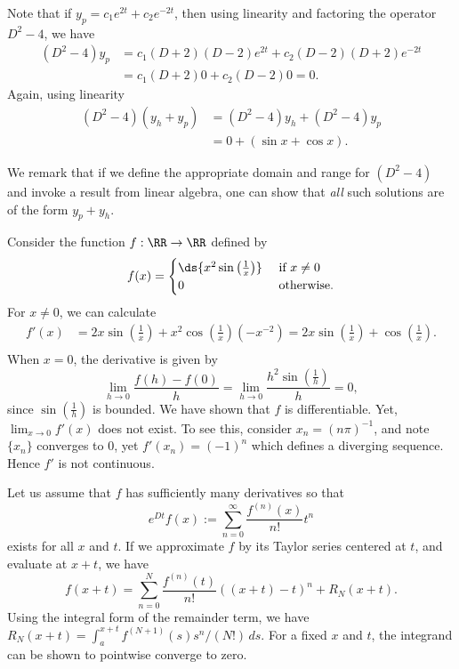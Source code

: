 \documentclass{homework}
\begin{document}

Note that if $y_p = c_1 e^{2t} + c_2 e^{-2t}$, then using linearity and factoring the operator $D^2 -4$, we have
\begin{align*}
  (D^2 - 4)y_p 
  &= c_1(D+2)(D - 2)e^{2t} + c_2(D-2)(D + 2)e^{-2t} \\
  &= c_1(D+2) 0 + c_2(D-2) 0 = 0.
\end{align*}
Again, using linearity
\begin{align*}
  (D^2 - 4) (y_h + y_p) 
  &= (D^2 -4)y_h + (D^2 -4)y_p\\
  &= 0 + (\sin x + \cos x).
\end{align*}

We remark that if we define the appropriate domain and range for $(D^2 - 4)$ and invoke a result from linear algebra, one can show that \emph{all} such solutions are of the form $y_p + y_h$.

\begin{solution}
  Consider the function $f:\RR \to \RR$ defined by
  $$
    f(x) = \begin{cases}
      \ds{x^2 \sin\left(\frac 1x\right)} & \text{ if } x \not= 0\\
      0 & \text{ otherwise.}
    \end{cases}
  $$
  For $x \not=0$, we can calculate
  \begin{align*}
    f'(x) 
    &= 2x \sin\left(\frac 1x\right) + x^2 \cos\left( \frac 1x\right) (-x^{-2})
    = 2x \sin\left(\frac 1x\right) + \cos\left( \frac 1x\right). \\
  \end{align*}
  When $x = 0$, the derivative is given by
  $$
    \lim_{h\to 0} \frac{ f(h) - f(0) }{h} = \lim_{h\to0} \frac{ h^2\sin\left(\frac 1h\right) }{h} = 0,
  $$
  since $\sin(\frac 1h)$ is bounded.  We have shown that $f$ is differentiable. Yet, $\lim_{x\to0} f'(x)$ does not exist. To see this, consider $x_n = (n\pi)^{-1}$, and note $\{x_n\}$ converges to 0, yet $f'(x_n) = (-1)^{n}$ which defines a diverging sequence. Hence $f'$ is not continuous.
\end{solution}


\begin{solution}
  Let us assume that $f$ has sufficiently many derivatives so that 
  $$
    e^{Dt}f(x) := \sum_{n=0}^\infty \frac{f^{(n)}(x)}{n!} t^n
  $$ 
  exists for all $x$ and $t$.  If we approximate $f$ by its Taylor series centered at $t$, and evaluate at $x+t$, we have
  $$
    f(x+t) = \sum_{n=0}^N \frac{f^{(n)}(t)}{n!} ((x+t) - t)^n + R_N(x+t).
  $$
  Using the integral form of the remainder term, we have $R_N(x+t) = \int_a^{x+t} f^{(N+1)}(s) s^n/(N!)\,ds$.  For a fixed $x$ and $t$, the integrand can be shown to pointwise converge to zero.  
\end{solution}
\end{document}
